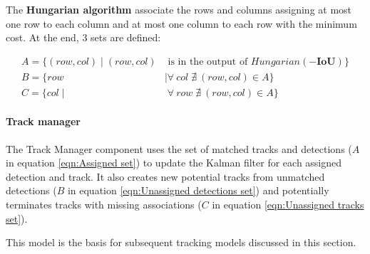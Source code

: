 \needspace{0.1\textheight}

{
    The \textbf{Hungarian algorithm} associate the rows and columns assigning at most one row to each column and at most one column to each row with the minimum cost. 
    At the end, 3 sets are defined:
}

\begin{subequations}
    \begin{align}
        \mathit{A} = \{ (row, col) \mid (row, col) &\text{ is in the output of } Hungarian(-\mathbf{IoU}) \}
        \label{eqn:Assigned set} \\[0.5cm]
        \mathit{B} = \{ row &\mid \forall \: col \; \nexists \: (row, col) \in A \}
        \label{eqn:Unassigned detections set} \\[0.5cm]
        \mathit{C} = \{ col \mid& \; \forall \: row \; \nexists \: (row, col) \in A \}
        \label{eqn:Unassigned tracks set}
    \end{align}
\end{subequations}

\paragraph{Track manager}
{
    The Track Manager component uses the set of matched tracks and detections ($\mathit{A}$ in equation \ref{eqn:Assigned set}) 
    to update the Kalman filter for each assigned detection and track. 
    It also creates new potential tracks from unmatched detections ($\mathit{B}$ in equation \ref{eqn:Unassigned detections set}) 
    and potentially terminates tracks with missing associations ($\mathit{C}$ in equation \ref{eqn:Unassigned tracks set}).
}

{
    This model is the basis for subsequent tracking models discussed in this section.
}
